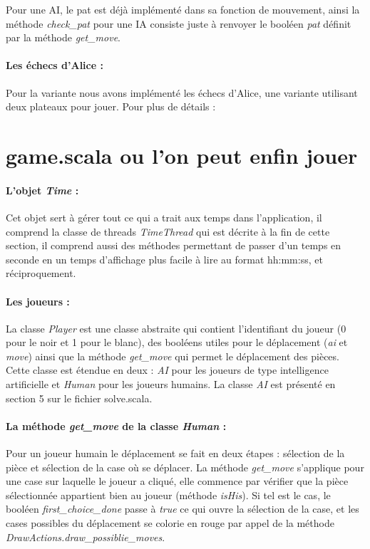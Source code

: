 \documentclass[a4paper]{article}
\begin{document}
Pour une AI, le pat est déjà implémenté dans sa fonction de mouvement, ainsi la méthode \textit{check\_pat} pour une IA consiste juste à renvoyer le booléen \textit{pat} définit par la méthode \textit{get\_move}. 

\paragraph{Les échecs d'Alice :}Pour la variante nous avons implémenté les échecs d'Alice, une variante utilisant deux plateaux pour jouer. Pour plus de détails : 

\section{game.scala ou l'on peut enfin jouer}

\paragraph{L'objet \textit{Time} :}Cet objet sert à gérer tout ce qui a trait aux temps dans l'application, il comprend la classe de threads \textit{TimeThread} qui est décrite à la fin de cette section, il comprend aussi des méthodes permettant de passer d'un temps en seconde en un temps d'affichage plus facile à lire au format hh:mm:ss, et réciproquement.

\paragraph{Les joueurs :} La classe \textit{Player} est une classe abstraite qui contient l'identifiant du joueur (0 pour le noir et 1 pour le blanc), des booléens utiles pour le déplacement (\textit{ai} et \textit{move}) ainsi que la méthode \textit{get\_move} qui permet le déplacement des pièces. \\

Cette classe est étendue en deux : \textit{AI} pour les joueurs de type intelligence artificielle et \textit{Human} pour les joueurs humains. La classe \textit{AI} est présenté en section 5 sur le fichier solve.scala. 

\paragraph{La méthode \textit{get\_move} de la classe \textit{Human} :}Pour un joueur humain le déplacement se fait en deux étapes : sélection de la pièce et sélection de la case où se déplacer. La méthode \textit{get\_move} s'applique pour une case sur laquelle le joueur a cliqué, elle commence par vérifier que la pièce sélectionnée appartient bien au joueur (méthode \textit{isHis}). Si tel est le cas, le booléen \textit{first\_choice\_done} passe à \textit{true} ce qui ouvre la sélection de la case, et les cases possibles du déplacement se colorie en rouge par appel de la méthode \textit{DrawActions.draw\_possiblie\_moves}. \\
\end{document}
